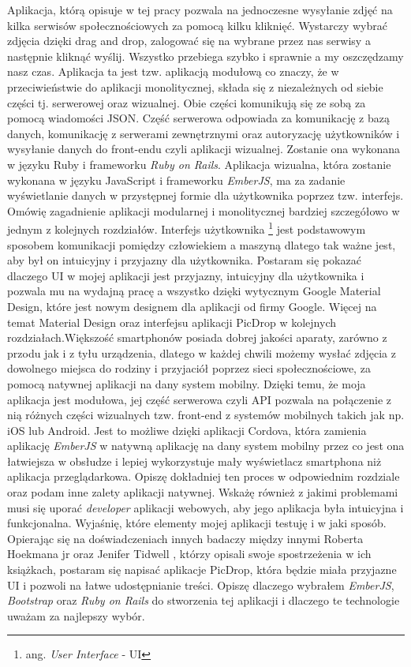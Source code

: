 \documentclass[brudnopis]{xmgr}
\begin{document}
Aplikacja, którą opisuje w tej pracy pozwala na jednoczesne wysyłanie zdjęć na kilka serwisów społecznościowych za pomocą kilku kliknięć. Wystarczy wybrać zdjęcia dzięki drag and drop, zalogować się na wybrane przez nas serwisy a następnie kliknąć wyślij. Wszystko przebiega szybko i sprawnie a my oszczędzamy nasz czas.  Aplikacja ta jest tzw. aplikacją modułową co znaczy, że w przeciwieństwie do aplikacji monolitycznej, składa się z  niezależnych od siebie części tj. serwerowej oraz wizualnej. Obie części komunikują się ze sobą za pomocą wiadomości JSON. Część serwerowa odpowiada za komunikację z bazą danych, komunikację z serwerami zewnętrznymi oraz autoryzację użytkowników i wysyłanie danych do front-endu czyli aplikacji wizualnej. Zostanie ona wykonana w języku Ruby i frameworku \textit{Ruby on Rails}.   Aplikacja wizualna, która zostanie wykonana w języku JavaScript i frameworku \textit{EmberJS}, ma za zadanie wyświetlanie danych w przystępnej formie dla użytkownika poprzez tzw. interfejs. Omówię zagadnienie aplikacji modularnej i monolitycznej bardziej szczegółowo w jednym z kolejnych rozdziałów. Interfejs użytkownika \footnote{ang. \textit{User Interface} - UI}  jest podstawowym sposobem komunikacji pomiędzy człowiekiem a maszyną dlatego tak ważne jest, aby był on intuicyjny i przyjazny dla użytkownika. Postaram się pokazać dlaczego UI w mojej aplikacji jest przyjazny, intuicyjny dla użytkownika i pozwala mu na wydajną pracę a wszystko dzięki wytycznym Google Material Design, które jest nowym designem dla aplikacji od firmy Google. Więcej na temat Material Design oraz interfejsu aplikacji PicDrop w kolejnych rozdziałach.\newline \indent Większość smartphonów posiada dobrej jakości aparaty, zarówno z przodu jak i z tyłu urządzenia, dlatego w każdej chwili możemy wysłać zdjęcia z dowolnego miejsca do rodziny i przyjaciół poprzez sieci społecznościowe, za pomocą natywnej aplikacji na dany system mobilny. Dzięki temu, że moja aplikacja jest modułowa, jej część serwerowa czyli API pozwala na połączenie z nią różnych części wizualnych tzw. front-end z systemów mobilnych takich jak np. iOS lub Android. Jest to możliwe dzięki aplikacji Cordova, która zamienia aplikację \textit{EmberJS} w natywną aplikację na dany system mobilny przez co jest ona łatwiejsza w obsłudze i lepiej wykorzystuje mały wyświetlacz smartphona niż aplikacja przeglądarkowa. Opiszę dokładniej ten proces w odpowiednim rozdziale oraz podam inne zalety aplikacji natywnej. Wskażę również z jakimi problemami musi się uporać \textit{developer} aplikacji webowych, aby jego aplikacja była intuicyjna i funkcjonalna. Wyjaśnię, które elementy mojej aplikacji testuję i w jaki sposób. Opierając się na  doświadczeniach innych badaczy  między innymi Roberta Hoekmana jr  \cite {magiaUI} oraz Jenifer Tidwell  \cite {projektowanieUI}, którzy opisali swoje spostrzeżenia w ich książkach, postaram się napisać aplikacje PicDrop, która  będzie miała przyjazne UI i pozwoli na łatwe udostępnianie treści. Opiszę dlaczego wybrałem \textit{EmberJS}, \textit{Bootstrap} oraz \textit{Ruby on Rails} do stworzenia tej aplikacji i dlaczego te technologie uważam za najlepszy wybór.
\end{document}
